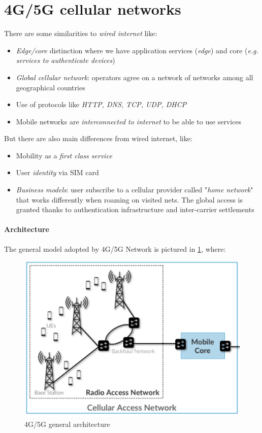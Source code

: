 \documentclass[10pt,a4paper]{report}
\theoremstyle{definition}
\begin{document}
\section{4G/5G cellular networks}\label{sec:4g5g-cellular-networks}
There are some similarities to \textit{wired internet} like:
\begin{itemize}
	\item 
	\textit{Edge/core} distinction where we have application services (\textit{edge}) and core (\textit{e.g. services to authenticate devices})
	\item 
	\textit{Global cellular network}: operators agree on a network of networks among all geographical countries
	\item 
	Use of protocols like \textit{HTTP, DNS, TCP, UDP, DHCP}
	\item 
	Mobile networks are \textit{interconnected to internet} to be able to use services
\end{itemize}

But there are also main differences from wired internet, like:
\begin{itemize}
	\item 
	Mobility as a \textit{first class service}
	\item 
	User \textit{identity} via SIM card
	\item 
	\textit{Business models}: user subscribe to a cellular provider called "\textit{home network}" that works differently when roaming on visited nets. The global access is granted thanks to authentication infrastructure and inter-carrier settlements
\end{itemize}
\paragraph{Architecture}
\label{sec:architecture}
The general model adopted by 4G/5G Network is pictured in \ref{4g-45-general-arch}, where:
\begin{figure}[h]
	\centering\includegraphics[scale=0.50]{images/Pasted image 20230309160212.png}
	\caption{4G/5G general architecture}
	\label{4g-45-general-arch}
\end{figure}
\end{document}
